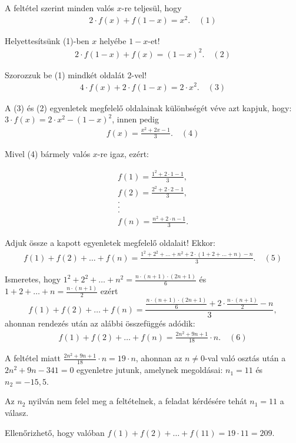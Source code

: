 \begin{solution}
A feltétel szerint minden valós $x$-re teljesül, hogy 
\begin{eqnarray*}
2\cdot f(x)+f(1-x)=x^{2}.\quad(1)
\end{eqnarray*}

Helyettesítsünk (1)-ben $x$ helyébe $1-x$-et! 
\begin{eqnarray*}
2\cdot f(1-x)+f(x)={(1-x)}^{2}.\quad(2)
\end{eqnarray*}

Szorozzuk be (1) mindkét oldalát 2-vel! 
\begin{eqnarray*}
4\cdot f(x)+2\cdot f(1-x)=2\cdot x^{2}.\quad(3)
\end{eqnarray*}

A (3) és (2) egyenletek megfelelő oldalainak különbségét véve azt
kapjuk, hogy: $3\cdot f(x)=2\cdot x^{2}-{(1-x)}^{2}$, innen pedig
\begin{eqnarray*}
f(x)=\frac{x^{2}+2x-1}{3}.\quad(4)
\end{eqnarray*}

Mivel (4) bármely valós $x$-re igaz, ezért:

\[
\begin{array}{c}
f(1)=\frac{1^{2}+2\cdot1-1}{3},\\
f(2)=\frac{2^{2}+2\cdot2-1}{3},\\
.\\
.\\
.\\
f(n)=\frac{n^{2}+2\cdot n-1}{3}.
\end{array}
\]

Adjuk össze a kapott egyenletek megfelelő oldalait! Ekkor: 
\begin{eqnarray*}
f(1)+f(2)+\dots+f(n)=\frac{1^{2}+2^{2}+\dots+n^{2}+2\cdot(1+2+\dots+n)-n}{3}.\quad(5)
\end{eqnarray*}

Ismeretes, hogy $1^{2}+2^{2}+\dots+n^{2}=\frac{n\cdot(n+1)\cdot(2n+1)}{6}$
és $1+2+\dots+n=\frac{n\cdot(n+1)}{2}$ ezért 
\[
f(1)+f(2)+\dots+f(n)=\frac{\frac{n\cdot(n+1)\cdot(2n+1)}{6}+2\cdot\frac{n\cdot(n+1)}{2}-n}{3},
\]
ahonnan rendezés után az alábbi összefüggés adódik: 
\begin{eqnarray*}
f(1)+f(2)+\dots+f(n)=\frac{2n^{2}+9n+1}{18}\cdot n.\quad(6)
\end{eqnarray*}

A feltétel miatt $\frac{2n^{2}+9n+1}{18}\cdot n=19\cdot n$, ahonnan
az $n\ne0$-val való osztás után a $2n^{2}+9n-341=0$ egyenletre jutunk,
amelynek megoldásai: $n_{1}=11$ és $n_{2}=-15,5$.

Az $n_{2}$ nyilván nem felel meg a feltételnek, a feladat kérdésére
tehát $n_{1}=11$ a válasz.

Ellenőrizhető, hogy valóban $f(1)+f(2)+\dots+f(11)=19\cdot11=209$. 
\end{solution}
